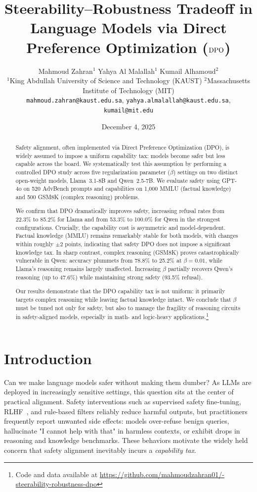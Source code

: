 \documentclass[a4paper, twocolumn, 9pt]{article}
\title{\vspace{-1.5cm}\textbf{Steerability–Robustness Tradeoff in Language Models via Direct Preference Optimization ($\text{DPO}$)}\vspace{0.5cm}}
\author{
    Mahmoud Zahran$^1$ \quad Yahya Al Malallah$^1$ \quad Kumail Alhamoud$^2$ \\
    \small $^1$King Abdullah University of Science and Technology (KAUST) \quad
    $^2$Massachusetts Institute of Technology (MIT) \\
    \small \texttt{mahmoud.zahran@kaust.edu.sa}, \texttt{yahya.almalallah@kaust.edu.sa}, \texttt{kumail@mit.edu}
}
\date{December 4, 2025}
\begin{document}
\maketitle

\begin{abstract}
Safety alignment, often implemented via Direct Preference Optimization (DPO), is widely assumed to impose a uniform capability tax: models become safer but less capable across the board. We systematically test this assumption by performing a controlled DPO study across five regularization parameter ($\beta$) settings on two distinct open-weight models, Llama~3.1-8B and Qwen~2.5-7B. We evaluate safety using GPT-4o on 520 AdvBench prompts and capabilities on 1{,}000 MMLU (factual knowledge) and 500 GSM8K (complex reasoning) problems.

We confirm that DPO dramatically improves safety, increasing refusal rates from 22.3\% to 85.2\% for Llama and from 53.3\% to 100.0\% for Qwen in the strongest configurations. Crucially, the capability cost is asymmetric and model-dependent. Factual knowledge (MMLU) remains remarkably stable for both models, with changes within roughly $\pm 2$ points, indicating that safety DPO does not impose a significant knowledge tax. In sharp contrast, complex reasoning (GSM8K) proves catastrophically vulnerable in Qwen: accuracy plummets from 78.8\% to 25.2\% at $\beta=0.01$, while Llama’s reasoning remains largely unaffected. Increasing $\beta$ partially recovers Qwen’s reasoning (up to 47.6\%) while maintaining strong safety (93.5\% refusal).

Our results demonstrate that the DPO capability tax is not uniform: it primarily targets complex reasoning while leaving factual knowledge intact. We conclude that $\beta$ must be tuned not only for safety, but also to manage the fragility of reasoning circuits in safety-aligned models, especially in math- and logic-heavy applications.\footnote{Code and data available at \url{https://github.com/mahmoudzahran01/-steerability-robustness-dpo}}
\end{abstract}



\section{Introduction}

Can we make language models safer without making them dumber?
As LLMs are deployed in increasingly sensitive settings, this question sits at the
center of practical alignment. Safety interventions such as supervised safety
fine-tuning, RLHF~\cite{rlhf}, and rule-based filters reliably reduce harmful outputs,
but practitioners frequently report unwanted side effects: models over-refuse benign
queries, hallucinate "I cannot help with that" in harmless contexts, or exhibit
drops in reasoning and knowledge benchmarks. These behaviors motivate the widely held
concern that safety alignment inevitably incurs a \emph{capability tax}.
\end{document}
